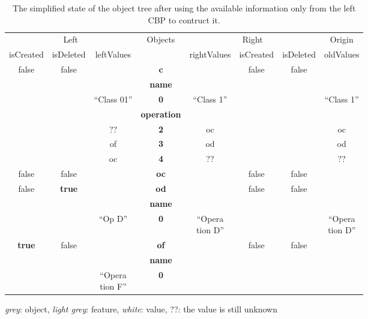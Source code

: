 \documentclass{llncs}
\begin{document}
\begin{table}
    \centering
    \begin{footnotesize}
        \caption{The simplified state of the object tree after using the available information only from the left CBP to contruct it.}
        \label{table:left_object_tree}
        \begin{tabular}{  c  c  c  c  c  c  c  c  }
            \hline
            \multicolumn{3}{c}{Left} & \multirow{2}{*}{Objects} & \multicolumn{3}{c}{Right} & Origin\\
            \hhline{---~----}
            isCreated & isDeleted & leftValues & & rightValues & isCreated & isDeleted & oldValues\\
            \hline
            \rowcolor{gray1}
            false & false & & \textbf{\textsf{c}} & & false & false & \\
            \rowcolor{gray2}
            & & & \textbf{\textsf{name}} & & & & \\
            & & ``Class 01'' & \textbf{0} & ``Class 1'' & & & ``Class 1'' \\
            \rowcolor{gray2}
            & & & \textbf{\textsf{operation}} & & & & \\
            & & ?? & \textbf{\small{2}} & oc & & & oc \\
            & & of & \textbf{\small{3}} & od & & & od \\
            & & oc & \textbf{\small{4}} & ?? & & & ?? \\
            \hline
            \rowcolor{gray1}
            false & false & & \textbf{\textsf{oc}} & & false & false & \\
            \hline
            \rowcolor{gray1}
            false & \textbf{true} & & \textbf{\textsf{od}} & & false & false & \\
            \rowcolor{gray2}
            & & & \textbf{\textsf{name}} & & & & \\
            & & ``Op D'' & \textbf{0} & \makecell{``Opera\\tion D''} & & & \makecell{``Opera\\tion D''} \\
            \hline
            \rowcolor{gray1}
            \textbf{true} & false & & \textbf{\textsf{of}} & & false & false & \\
            \rowcolor{gray2}
            & & & \textbf{\textsf{name}} & & & & \\
            & & \makecell{``Opera\\tion F''} & \textbf{0} & & & &  \\
            \hline
        \end{tabular}
        \begin{flushright}
            \textit{grey}: object, \textit{light grey}: feature, \textit{white}: value, ??: the value is still unknown
        \end{flushright}
    \end{footnotesize}
\end{table}
\end{document}
